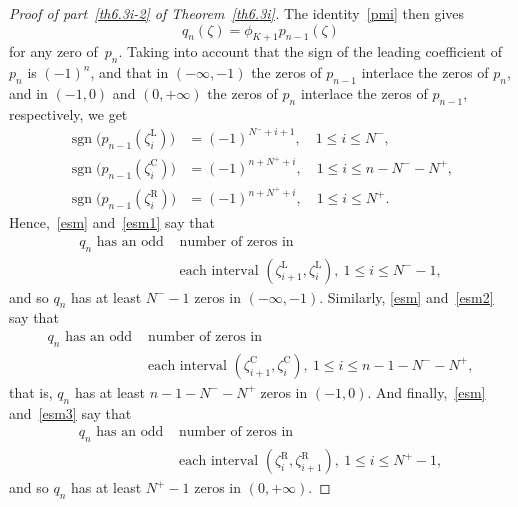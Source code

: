 \documentclass[10pt, a4paper, leqno]{amsart}
\numberwithin{equation}{section}
\theoremstyle{plain}
\theoremstyle{remark}
\newcommand{\Ll}{\mathrm{L}}
\newcommand{\C}{\mathrm{C}}
\newcommand{\R}{\mathrm{R}}
\newcommand{\sgn}{\operatorname{sgn}}
\begin{document}
\begin{proof}[Proof of part~\eqref{th6.3i-2} of Theorem~\ref{th6.3i}]
The identity~\eqref{pmi} then gives
\begin{equation}
\label{esm}
  q_n(\zeta) = \phi_{K+1}p_{n-1}(\zeta)
\end{equation}
for any zero of~$p_n$.
Taking into account that the sign of the leading coefficient of $p_n$ is $(-1)^n$,
and that in $(-\infty,-1)$ the zeros of $p_{n-1}$ interlace the zeros of $p_n$, and in
$(-1,0)$ and $(0,+\infty)$ the zeros of $p_n$ interlace the zeros of $p_{n-1}$, respectively,
we get
\begin{align}
\label{esm1}
  \sgn\bigl(p_{n-1}(\zeta_{i}^{\Ll})\bigr) &= (-1)^{N^-+i+1},\quad 1\le i\le N^-, \\
\label{esm2}
  \sgn\bigl(p_{n-1}(\zeta_{i}^{\C})\bigr) &= (-1)^{n+N^++i},\quad 1\le i\le n-N^--N^+, \\
\label{esm3}
  \sgn\bigl(p_{n-1}(\zeta_{i}^{\R})\bigr) &= (-1)^{n+N^++i},\quad 1\le i\le N^+.
\end{align}
Hence,~\eqref{esm} and~\eqref{esm1} say that
\begin{equation}
\label{ton1}
\begin{aligned}
  q_n \text{ has an odd }&\text{number of zeros in} \\ 
  &\text{each interval } (\zeta_{i+1}^{\Ll},\zeta_i^{\Ll}), \ 1\le i\le N^--1,
\end{aligned}
\end{equation}
and so $q_n$ has at least $N^--1$ zeros in $(-\infty,-1)$. Similarly,
\eqref{esm} and~\eqref{esm2} say that
\begin{equation}
\label{ton2}
\begin{aligned}
  q_n \text{ has an odd } & \text{number of zeros in}\\ 
  &\text{each interval } (\zeta_{i+1}^{\C},\zeta_i^{\C}),\ 1\le i\le n-1-N^--N^+,
\end{aligned}
\end{equation}
that is, $q_n$ has at least $n-1-N^--N^+$ zeros in $(-1,0)$. And finally,~\eqref{esm} and~\eqref{esm3} say that
\begin{equation*}
\begin{aligned}
  q_n \text{ has an odd }&\text{number of zeros in} \\ 
  &\text{each interval } (\zeta_{i}^{\R},\zeta_{i+1}^{\R}),\ 1\le i\le N^+-1,
\end{aligned}
\end{equation*}
and so $q_n$ has at least $N^+-1$ zeros in $(0,+\infty)$.


\end{proof}
\end{document}
